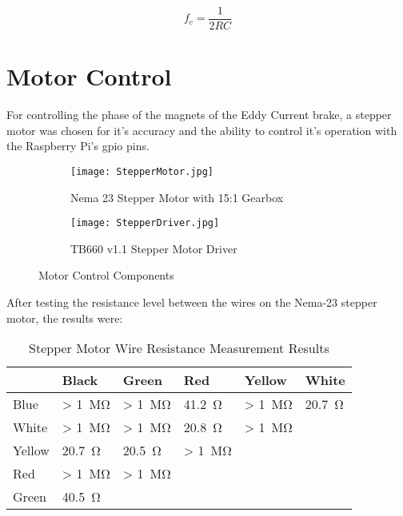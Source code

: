 \begin{equation}
	f_c = \frac{1}{2 R C}
\end{equation}

\newpage

\section{Motor Control}

For controlling the phase of the magnets of the Eddy Current brake, a stepper motor was chosen for it's accuracy and the ability to control it's operation with the Raspberry Pi's \acs{gpio} pins.

\begin{figure}[H]
	\centering
	\begin{subfigure}[t]{.550\textwidth}
		\centering
		\texttt{[image: StepperMotor.jpg]}
		\caption{Nema 23 Stepper Motor with 15:1 Gearbox}
		\citep{Robotics:2022}
		\label{fig:stepper}
	\end{subfigure}
	\begin{subfigure}[t]{.41\textwidth}
		\centering
		\texttt{[image: StepperDriver.jpg]}
		\caption{TB660 v1.1 Stepper Motor Driver}
		\citep{Communica:2022}
		\label{fig:motorDriver}
	\end{subfigure}
	\caption{Motor Control Components}
	\label{fig:Motor}
\end{figure}



After testing the resistance level between the wires on the Nema-23 stepper motor, the results were:

\begin{table}[H]
		\renewcommand{\arraystretch}{\tablestretch}
	\centering
	\caption{Stepper Motor Wire Resistance Measurement Results}
	\begin{tabularx}{\textwidth}{X X X X X X  }
		\toprule
		       & Black               & Green                 & Red                   & Yellow                & White                 \\
		\midrule
		Blue   & > \SI{1}{\mega\ohm} & > \SI{1}{\mega\ohm}   & \SI{41.2}{\ohm}       & > \SI{1}{\mega\ohm}   & \SI{20.7}{\ohm}       \\
		White  & > \SI{1}{\mega\ohm} & > \SI{1}{\mega\ohm}   & \SI{20.8}{\ohm}       & > \SI{1}{\mega\ohm}   & \cellcolor{lightgray} \\
		Yellow & \SI{20.7}{\ohm}     & \SI{20.5}{\ohm}       & > \SI{1}{\mega\ohm}   & \cellcolor{lightgray} & \cellcolor{lightgray} \\
		Red    & > \SI{1}{\mega\ohm} & > \SI{1}{\mega\ohm}   & \cellcolor{lightgray} & \cellcolor{lightgray} & \cellcolor{lightgray} \\
		Green  & \SI{40.5}{\ohm}     & \cellcolor{lightgray} & \cellcolor{lightgray} & \cellcolor{lightgray} & \cellcolor{lightgray} \\
		\bottomrule
	\end{tabularx}
	\label{tab:nemaTest}
\end{table}


